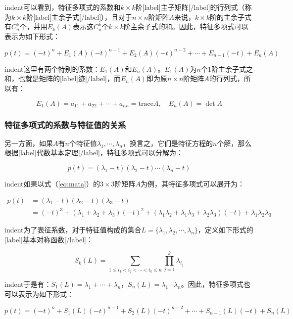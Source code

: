 \documentclass[UTF8,nofonts]{ctexart}
\begin{document}
indent可以看到，特征多项式的系数和$k \times k$阶[label]主子矩阵[/label]的行列式（称为$k \times k$阶[label]主余子式[/label]），且对于$n \times n$阶矩阵$A$来说，$k \times k$阶的主余子式有$C_n^k$个，并用$E_k(A)$表示这$C_n^k$个$k \times k$阶主余子式的和。因此，特征多项式可以表示为如下形式：

\begin{equation}
\label{eq:detchpoly}
p(t)=(-t)^n+E_1(A)(-t)^{n-1}+E_2(A)(-t)^{n-2}+\cdots+E_{n-1}(-t)+E_n(A)
\end{equation}

indent这里有两个特别的系数：$E_1(A)$和$E_n(A)$。$E_1(A)$为$n$个$1$阶主余子式之和，也就是矩阵的[label]迹[/label]，而$E_n(A)$即为原$n \times n$阶矩阵$A$的行列式，所以有：

\[E_1(A)=a_{11}+a_{22}+\cdots+a_{nn}=\text{trace}A,\quad E_n(A)=\det A\]

\subsubsection*{特征多项式的系数与特征值的关系}

另一方面，如果$A$有$n$个特征值$\lambda_1,\cdots,\lambda_n$，换言之，它们是特征方程的$n$个解，那么根据[label]代数基本定理[/label]，特征多项式可以分解为：

\[p(t)=(\lambda_1-t)(\lambda_2-t)\cdots(\lambda_n-t)\]

indent如果以式（\ref{eq:mata}）的$3 \times 3$阶矩阵$A$为例，其特征多项式可以展开为：

\begin{align*}
p(t)
&=(\lambda_1-t)(\lambda_2-t)(\lambda_3-t) \\
&=(-t)^3+(\lambda_1+\lambda_2+\lambda_3)(-t)^2+(\lambda_1\lambda_2+\lambda_1\lambda_3+\lambda_2\lambda_3)(-t)+\lambda_1\lambda_2\lambda_3
\end{align*}

indent为了表征系数，对于特征值构成的集合$L=\{\lambda_1,\lambda_2,\cdots,\lambda_n\}$，定义如下形式的[label]基本对称函数[/label]：

\begin{equation}
\label{eq:esf}
\displaystyle{S_k(L)=\sum_{1 \leq i_1<i_2<\cdots<i_k\leq n}\prod_{j=1}^k\lambda_{i_j}}
\end{equation}

indent于是有：$S_1(L)=\lambda_1+\cdots+\lambda_n$，$S_n(L)=\lambda_1\cdots\lambda_n$。因此，特征多项式也可以表示为如下形式：

\begin{equation}
\label{eq:eigchpoly}
p(t)=(-t)^n+S_1(L)(-t)^{n-1}+S_2(L)(-t)^{n-2}+\cdots+S_{n-1}(L)(-t)+S_n(L)
\end{equation}
\end{document}
